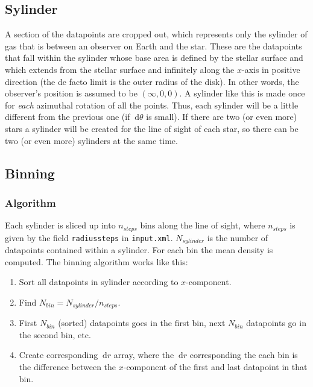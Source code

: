 \documentclass[a4paper, 12pt, english, titlepage]{article}
\newcommand{\D}[1]{\ \mathrm{d}#1} %
\begin{document}
\subsection{Sylinder}
    A section of the datapoints are cropped out, which represents only the sylinder of gas that is between an observer on Earth and the star. These are the datapoints that fall within the sylinder whose base area is defined by the stellar surface and which extends from the stellar surface and infinitely along the $x$-axis in positive direction (the de facto limit is the outer radius of the disk). In other words, the observer's position is assumed to be $(\infty, 0, 0)$. A sylinder like this is made once for \emph{each} azimuthal rotation of all the points. Thus, each sylinder will be a little different from the previous one (if $\D\theta$ is small). If there are two (or even more) stars a sylinder will be created for the line of sight of each star, so there can be two (or even more) sylinders at the same time.

\subsection{Binning}

    \subsubsection{Algorithm}
        Each sylinder is sliced up into $n_{steps}$ bins along the line of sight, where $n_{steps}$ is given by the field \texttt{radiussteps} in \texttt{input.xml}. $N_{sylinder}$ is the number of datapoints contained within a sylinder. For each bin the mean density is computed. The binning algorithm works like this:
        \begin{enumerate}
            \item Sort all datapoints in sylinder according to $x$-component.
            \item Find $N_{bin} = N_{sylinder} / n_{steps}$.
            \item First $N_{bin}$ (sorted) datapoints goes in the first bin, next $N_{bin}$ datapoints go in the second bin, etc.
            \item Create corresponding $\D r$ array, where the $\D r$ corresponding the each bin is the difference between the $x$-component of the first and last datapoint in that bin.
        \end{enumerate}
\end{document}
